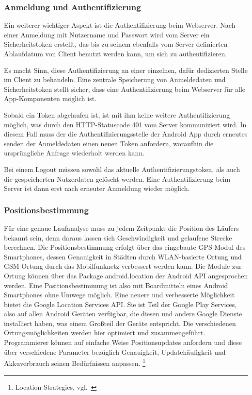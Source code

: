 \subsubsection{Anmeldung und Authentifizierung}
Ein weiterer wichtiger Aspekt ist die Authentifizierung beim Webserver. Nach einer Anmeldung mit Nutzername und Passwort wird vom Server ein Sicherheitstoken erstellt, das bis zu seinem ebenfalls vom Server definierten Ablaufdatum von Client benutzt werden kann, um sich zu authentifizieren.

Es macht Sinn, diese Authentifizierung an einer einzelnen, dafür dedizierten Stelle im Client zu behandeln. Eine zentrale Speicherung von Anmeldedaten und Sicherheitstoken stellt sicher, dass eine Authentifizierung beim Webserver für alle App-Komponenten möglich ist.

Sobald ein Token abgelaufen ist, ist mit ihm keine weitere Authentifizierung möglich, was durch den HTTP-Statuscode 401 vom Server kommuniziert wird. In diesem Fall muss der die Authentifizierungsstelle der Android App durch erneutes senden der Anmeldedaten einen neuen Token anfordern, woraufhin die ursprüngliche Anfrage wiederholt werden kann.

Bei einem Logout müssen sowohl das aktuelle Authentifizierungstoken, als auch die gespeicherten Nutzerdaten gelöscht werden. Eine Authentifizierung beim Server ist dann erst nach erneuter Anmeldung wieder möglich.
\subsubsection{Positionsbestimmung}
Für eine genaue Laufanalyse muss zu jedem Zeitpunkt die Position des Läufers bekannt sein, denn daraus lassen sich Geschwindigkeit und gelaufene Strecke berechnen. Die Positionsbestimmung erfolgt über das eingebaute GPS-Modul des Smartphones, dessen Genauigkeit in Städten durch WLAN-basierte Ortung und GSM-Ortung durch das Mobilfunknetz verbessert werden kann. Die Module zur Ortung können über das Package android.location der Android API angesprochen werden. Eine Positionsbestimmung ist also mit Boardmitteln eines Android Smartphones ohne Umwege möglich. Eine neuere und verbesserte Möglichkeit bietet die Google Location Services API. Sie ist Teil der Google Play Services, also auf allen Android Geräten verfügbar, die diesen und andere Google Dienste installiert haben, was einem Großteil der Geräte entspricht. Die verschiedenen Ortungsmöglichkeiten werden hier optimiert und zusammengeführt. Programmierer können auf einfache Weise Positionsupdates anfordern und diese über verschiedene Parameter bezüglich Genauigkeit, Updatehäufigkeit und Akkuverbrauch seinen Bedürfnissen anpassen. \footnote{Location Strategies, vgl.~\cite{androidlocation}}
